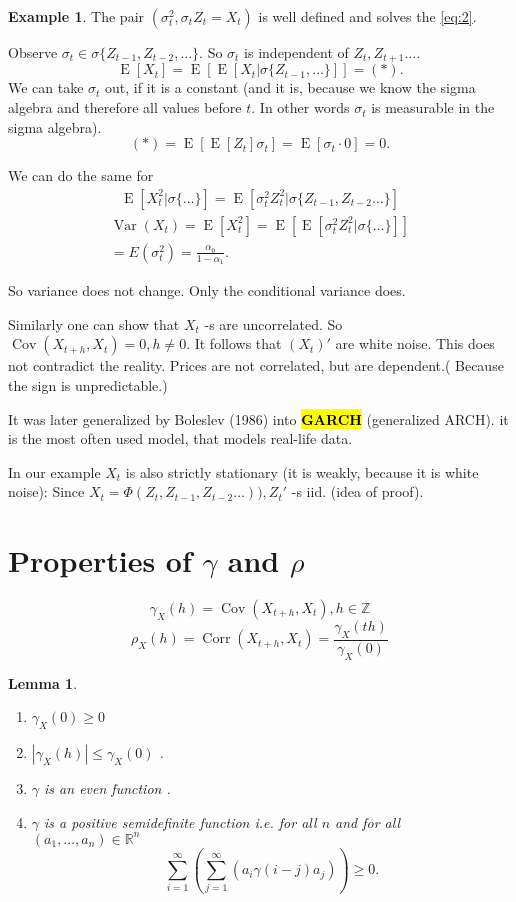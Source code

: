 \documentclass[12pt,a4paper, notitlepage]{book}
\newcommand{\hlc}[2][yellow]{ {\sethlcolor{#1} \hl{#2}} }
\newcommand{\hlcr}[1]{\hlc[lightred]{#1}}
\theoremstyle{definition} %
\newtheorem{example}[definition]{Example}
\theoremstyle{plain} %
\newtheorem{lemma}[definition]{Lemma}
\newcommand{\R}{\mathbb R}
\newcommand{\Z}{\mathbb Z}
\DeclareMathOperator{\Var}{Var}
\DeclareMathOperator{\Cov}{Cov}
\DeclareMathOperator{\E}{E}
\DeclareMathOperator{\Corr}{Corr}
\newcommand{\New}[1]{ {\bf \hlcr{#1} } }
\begin{document}
\begin{example}
The pair $(\sigma_t^2, \sigma_t Z_t = X_t)$ is well defined and solves the  
\ref{eq:2}.

Observe $\sigma_t \in \sigma\{ Z_{t-1},Z_{t-2}, \dots\}$. So $\sigma_t$ is independent of $Z_t, Z_{t+1} \dots$.
\[ \E[X_t] = \E\left[ \E\left[ X_t | \sigma\{ Z_{t-1}, \dots\} \right] \right]  = (*). \]
 We can take $\sigma_t$ out, if it is a constant (and it is, because we know
 the sigma algebra and therefore all values before $t$. In other words $\sigma_t$ is measurable in the sigma algebra). 
\[ (*) = \E \left[ \E \left[ Z_t \right] \sigma_t  \right] = \E \left[ \sigma_t \cdot 0 \right] = 0 . \]

We can do the same for 
\begin{align*} \E\left[ X_t^2 | \sigma\{\dots\} \right]  =  \E \left[  \sigma_t^2 Z_t ^2 | \sigma \{ Z_{t-1}, Z_{t-2} \ldots \} \right] \end{align*}
\begin{align*} \Var(X_t) = \E[X_t^2] = \E[\E[ \sigma_t^2 Z_t^2 | \sigma\{\dots\} ] ] \\
 = E(\sigma_t^2) = \frac{\alpha_0}{1 - \alpha_1}. \end{align*}

So variance does not change. Only the conditional variance does.

Similarly one can show that $X_t$ -s are uncorrelated. So $ \Cov(X_{t+ h}, X_t) = 0, h \neq 0$. It follows that $(X_t)'$ are white noise. This does not contradict the reality. Prices are not correlated, but are dependent.( Because the sign is unpredictable.)


It was later generalized by Boleslev (1986) into \New{GARCH} (generalized ARCH). it is the most often used model, that models real-life data.

In our example $X_t$ is also strictly stationary (it is weakly, because it is white noise):
Since $X_t = \Phi(Z_t, Z_{t-1}, Z_{t-2}  \dots) ) ,  Z_t ' $ -s iid. (idea of proof). 
\end{example}

\section{Properties of $\gamma$ and $\rho$}

\[\gamma_X(h) = \Cov(X_{t+h}, X_t), h \in \Z \]
\[ \rho_X(h) = \Corr(X_{t+h},X_t) = \frac{ \gamma_X(th) }{ \gamma_X(0) } \]

\begin{lemma}
\begin{enumerate}

\item $\gamma_X(0) \geq 0$
\item $|\gamma_X(h)| \leq \gamma_X(0)$ .
\item $\gamma$ is an even function .
\item $\gamma$ is a positive semidefinite function i.e. for all $n$ and for all $(a_1, \dots, a_n) \in \R^n$ 
\[ \sum_{i=1}^\infty \left( \sum_{j=1 }^\infty \left( a_i \gamma(i -j) a_j \right) \right) \geq 0 . \]
\end{enumerate}
\end{lemma}
\end{document}
